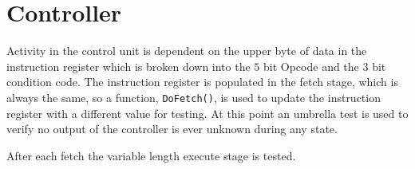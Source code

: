 
\section{Controller}

Activity in the control unit is dependent on the upper byte of data in the instruction register which is broken down into the $5$ bit Opcode and the $3$ bit condition code.  
The instruction register is populated in the fetch stage, which is always the same, so a function, \texttt{DoFetch()}, is used to update the instruction register with a different value for testing.
At this point an umbrella test is used to verify no output of the controller is ever unknown during any state.

After each fetch the variable length execute stage is tested.


%







